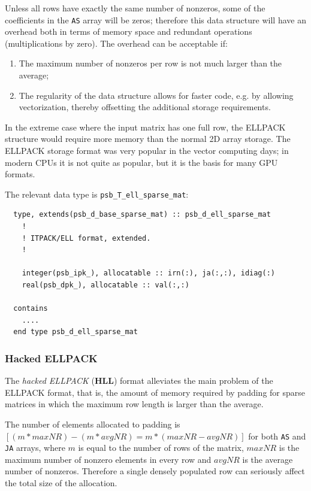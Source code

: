 Unless all rows have exactly the same number of nonzeros, some of the
coefficients in the \verb|AS| array will be zeros; therefore this
data structure will have  an overhead both in terms of memory space
and redundant operations (multiplications by zero).  The overhead can
be acceptable if: 
\begin{enumerate}
\item The maximum number of nonzeros per row is not much larger than
  the    average;
\item The regularity of the data structure allows for faster  code,
  e.g. by allowing vectorization, thereby offsetting the additional
  storage requirements.  
\end{enumerate}
In the extreme case where the input matrix has one full row, the
ELLPACK structure would require more memory than the normal 2D array
storage. The ELLPACK storage format was very popular in the vector
computing days; in modern CPUs it is not quite as popular, but it
is  the basis for many GPU formats. 

The relevant data type is \verb|psb_T_ell_sparse_mat|:
\begin{verbatim}
  type, extends(psb_d_base_sparse_mat) :: psb_d_ell_sparse_mat
    !
    ! ITPACK/ELL format, extended.
    !     
    
    integer(psb_ipk_), allocatable :: irn(:), ja(:,:), idiag(:)
    real(psb_dpk_), allocatable :: val(:,:)

  contains
    ....
  end type psb_d_ell_sparse_mat
\end{verbatim}


\subsubsection*{Hacked ELLPACK}

The \textit{hacked ELLPACK} (\textbf{HLL}) format 
alleviates the main problem of the ELLPACK format, that is, 
the  amount of  memory required by  padding for  sparse matrices in
which the maximum row length is  larger than the average.

The number of  elements  allocated to padding is $[(m*maxNR) -
(m*avgNR) = m*(maxNR-avgNR)]$ 
for both \verb|AS|  and \verb|JA| arrays,
where $m$ is equal to the number of rows of the matrix, $maxNR$ is the
maximum number of nonzero elements 
in every row and $avgNR$ is the average number of nonzeros. 
Therefore a single densely populated row can seriously affect the
total size of the allocation. 

